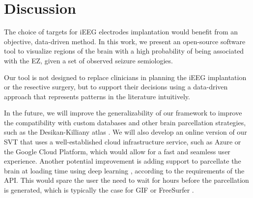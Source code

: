 \section{Discussion}
\label{sec:svt_discussion}

The choice of targets for \ac{iEEG} electrodes implantation would benefit from an objective, data-driven method.
In this work, we present an open-source software tool to visualize regions of the brain with a high probability of being associated with the \ac{EZ}, given a set of observed seizure semiologies.

Our tool is not designed to replace clinicians in planning the \ac{iEEG} implantation or the resective surgery, but to support their decisions using a data-driven approach that represents patterns in the literature intuitively.

In the future, we will improve the generalizability of our framework to improve the compatibility with custom databases and other brain parcellation strategies, such as the Desikan-Killiany atlas \cite{desikan_automated_2006}.
We will also develop an online version of our \ac{SVT} that uses a well-established cloud infrastructure service, such as Azure or the Google Cloud Platform, which would allow for a fast and seamless user experience.
Another potential improvement is adding support to parcellate the brain at loading time using deep learning \cite{li_compactness_2017,perez-garcia_fepegarhighresnet_2019}, according to the requirements of the \ac{API}.
This would spare the user the need to wait for hours before the parcellation is generated, which is typically the case for \ac{GIF} \cite{cardoso_geodesic_2015} or FreeSurfer%
.





